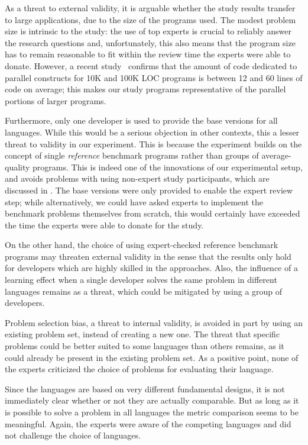 As a threat to external validity, it is arguable whether the study results transfer to large applications, due to the size of the programs used. The modest problem size is intrinsic to the study: the use of top experts is crucial to reliably answer the research questions and, unfortunately, this also means that the program size has to remain reasonable to fit within the review time the experts were able to donate. However, a recent study~\cite{okur:2012:libraries} confirms that the amount of code dedicated to parallel constructs for 10K and 100K LOC programs is between 12 and 60 lines of code on average; this makes our study programs representative of the parallel portions of larger programs. 

Furthermore, only one developer is used to provide the base versions for all languages. While this would be a serious objection in other contexts, this a lesser threat to validity in our experiment. This is because the experiment builds on the concept of single \emph{reference} benchmark programs rather than groups of average-quality programs. This is indeed one of the innovations of our experimental setup, and avoids problems with using non-expert study participants, which are discussed in . The base versions were only provided to enable the expert review step; while alternatively, we could have asked experts to implement the benchmark problems themselves from scratch, this would certainly have exceeded the time the experts were able to donate for the study. 

On the other hand, the choice of using expert-checked reference benchmark programs may threaten external validity in the sense that the results only hold for developers which are highly skilled in the approaches. Also, the influence of a learning effect when a single developer solves the same problem in different languages remains as a threat, which could be mitigated by using a group of developers.

Problem selection bias, a threat to internal validity, is avoided in part by using an existing problem set, instead of creating a new one. The threat that specific problems could be better suited to some languages than others remains, as it could already be present in the existing problem set. As a positive point, none of the experts criticized the choice of problems for evaluating their language.

Since the languages are based on very different fundamental designs, it is not immediately clear whether or not they are actually comparable. But as long as it is possible to solve a problem in all languages the metric comparison seems to be meaningful. Again, the experts were aware of the competing languages and did not challenge the choice of languages.
  





